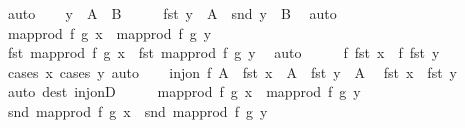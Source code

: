 \begin{isabellebody}
\ auto\isanewline
\ \ \isamarkupfalse%
\ {\isachardoublequoteopen}y\ {\isasymin}\ A\ {\isasymtimes}\ B{\isachardoublequoteclose}\isanewline
\ \ \isamarkupfalse%
\ \isamarkupfalse%
\ {\isachardoublequoteopen}fst\ y\ {\isasymin}\ A{\isachardoublequoteclose}\ \ {\isachardoublequoteopen}snd\ y\ {\isasymin}\ B{\isachardoublequoteclose}\ \isamarkupfalse%
\ auto\isanewline
\ \ \isamarkupfalse%
\ {\isachardoublequoteopen}map{\isacharunderscore}{\kern0pt}prod\ f\ g\ x\ {\isacharequal}{\kern0pt}\ map{\isacharunderscore}{\kern0pt}prod\ f\ g\ y{\isachardoublequoteclose}\isanewline
\ \ \isamarkupfalse%
\ \isamarkupfalse%
\ {\isachardoublequoteopen}fst\ {\isacharparenleft}{\kern0pt}map{\isacharunderscore}{\kern0pt}prod\ f\ g\ x{\isacharparenright}{\kern0pt}\ {\isacharequal}{\kern0pt}\ fst\ {\isacharparenleft}{\kern0pt}map{\isacharunderscore}{\kern0pt}prod\ f\ g\ y{\isacharparenright}{\kern0pt}{\isachardoublequoteclose}\ \isamarkupfalse%
\ auto\isanewline
\ \ \isamarkupfalse%
\ \isamarkupfalse%
\ {\isachardoublequoteopen}f\ {\isacharparenleft}{\kern0pt}fst\ x{\isacharparenright}{\kern0pt}\ {\isacharequal}{\kern0pt}\ f\ {\isacharparenleft}{\kern0pt}fst\ y{\isacharparenright}{\kern0pt}{\isachardoublequoteclose}\ \isamarkupfalse%
\ {\isacharparenleft}{\kern0pt}cases\ x{\isacharcomma}{\kern0pt}\ cases\ y{\isacharparenright}{\kern0pt}\ auto\isanewline
\ \ \isamarkupfalse%
\ {\isacartoucheopen}inj{\isacharunderscore}{\kern0pt}on\ f\ A{\isacartoucheclose}\ \ {\isacartoucheopen}fst\ x\ {\isasymin}\ A{\isacartoucheclose}\ \ {\isacartoucheopen}fst\ y\ {\isasymin}\ A{\isacartoucheclose}\ \isamarkupfalse%
\ {\isachardoublequoteopen}fst\ x\ {\isacharequal}{\kern0pt}\ fst\ y{\isachardoublequoteclose}\isanewline
\ \ \ \ \isamarkupfalse%
\ {\isacharparenleft}{\kern0pt}auto\ dest{\isacharcolon}{\kern0pt}\ inj{\isacharunderscore}{\kern0pt}onD{\isacharparenright}{\kern0pt}\isanewline
\ \ \isamarkupfalse%
\ \isamarkupfalse%
\ {\isacartoucheopen}map{\isacharunderscore}{\kern0pt}prod\ f\ g\ x\ {\isacharequal}{\kern0pt}\ map{\isacharunderscore}{\kern0pt}prod\ f\ g\ y{\isacartoucheclose}\isanewline
\ \ \isamarkupfalse%
\ {\isachardoublequoteopen}snd\ {\isacharparenleft}{\kern0pt}map{\isacharunderscore}{\kern0pt}prod\ f\ g\ x{\isacharparenright}{\kern0pt}\ {\isacharequal}{\kern0pt}\ snd\ {\isacharparenleft}{\kern0pt}map{\isacharunderscore}{\kern0pt}prod\ f\ g\ y{\isacharparenright}{\kern0pt}{\isachardoublequoteclose}\ \isamarkupfalse%

\end{isabellebody}
